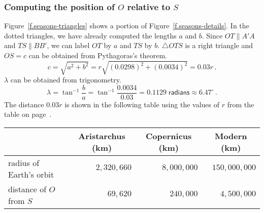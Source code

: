 \subsubsection*{Computing the position of $O$ relative to $S$}

Figure~\ref{f.seasons-triangles} shows a portion of Figure~\ref{f.seasons-details}. In the dotted triangles, we have already computed the lengths $a$ and $b$. Since $OT\parallel A'A$ and $TS\parallel BB'$, we can label $OT$ by $a$ and $TS$ by $b$. $\triangle OTS$ is a right triangle and $OS=c$ can be obtained from Pythagoras's theorem.
\[
c = \sqrt{a^2+b^2}=r\sqrt{(0.0298)^2+(0.0034)^2}=0.03r\,.
\]
$\lambda$ can be obtained from trigonometry.
\[
\lambda = \tan^{-1} \frac{b}{a} = \tan^{-1} \frac{0.0034}{0.03} = 0.1129\;\textsf{radians} \approx 6.47^\circ\,.
\]
The distance $0.03r$ is shown in the following table using the values of $r$ from the table on page~\pageref{p.table1}.

\begin{center}
\begin{tabular}{|l|r|r|r|}
\hline
&\multicolumn{1}{|c|}{Aristarchus (km)}&
\multicolumn{1}{|c|}{Copernicus (km)} & \multicolumn{1}{|c|}{Modern (km)}\\
\hline\hline
radius of Earth's orbit & $2,320,660$ & $8,000,000$ & $150,000,000$\\\hline
distance of $O$ from $S$ & $69,620$ & $240,000$ & $4,500,000$ \\
\hline
\end{tabular}
\end{center}

